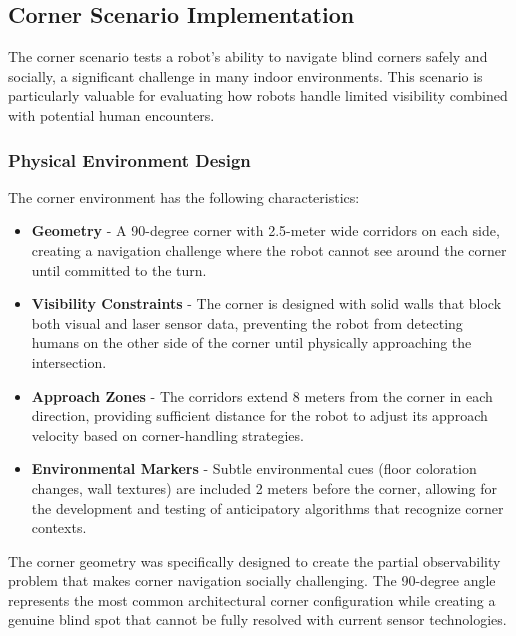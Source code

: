 \subsection{Corner Scenario Implementation}
The corner scenario tests a robot's ability to navigate blind corners safely and socially, 
a significant challenge in many indoor environments. This scenario is particularly valuable 
for evaluating how robots handle limited visibility combined with potential human encounters.

\subsubsection{Physical Environment Design}
The corner environment has the following characteristics:
\begin{itemize}
    \item \textbf{Geometry} - A 90-degree corner with 2.5-meter wide corridors on each 
    side, creating a navigation challenge where the robot cannot see around the corner 
    until committed to the turn.
    \item \textbf{Visibility Constraints} - The corner is designed with solid walls that 
    block both visual and laser sensor data, preventing the robot from detecting humans 
    on the other side of the corner until physically approaching the intersection.
    \item \textbf{Approach Zones} - The corridors extend 8 meters from the corner in 
    each direction, providing sufficient distance for the robot to adjust its approach 
    velocity based on corner-handling strategies.
    \item \textbf{Environmental Markers} - Subtle environmental cues (floor coloration 
    changes, wall textures) are included 2 meters before the corner, allowing for the 
    development and testing of anticipatory algorithms that recognize corner contexts.
\end{itemize}
The corner geometry was specifically designed to create the partial observability problem 
that makes corner navigation socially challenging. The 90-degree angle represents the most 
common architectural corner configuration while creating a genuine blind spot that cannot 
be fully resolved with current sensor technologies.


